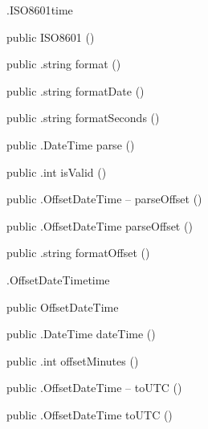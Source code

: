 \begin{CrexxClass}{.ISO8601}{time}

  \begin{Hierarchy}
  \end{Hierarchy}

  \begin{Members}

    \Factory
      {public}
      {ISO8601}
      {()}

    \Method
      {public}
      {.string}
      {format}
      {()}

    \Method
      {public}
      {.string}
      {formatDate}
      {()}

    \Method
      {public}
      {.string}
      {formatSeconds}
      {()}

    \Method
      {public}
      {.DateTime}
      {parse}
      {()}

    \Method
      {public}
      {.int}
      {isValid}
      {()}

    \Method
      {public}
      {.OffsetDateTime}
      {-- parseOffset}
      {()}

    \Method
      {public}
      {.OffsetDateTime}
      {parseOffset}
      {()}

    \Method
      {public}
      {.string}
      {formatOffset}
      {()}

  \end{Members}
\end{CrexxClass}

\begin{CrexxClass}{.OffsetDateTime}{time}

  \begin{Hierarchy}
  \end{Hierarchy}

  \begin{Members}

    \Factory
      {public}
      {OffsetDateTime}
      {}

    \Method
      {public}
      {.DateTime}
      {dateTime}
      {()}

    \Method
      {public}
      {.int}
      {offsetMinutes}
      {()}

    \Method
      {public}
      {.OffsetDateTime}
      {-- toUTC}
      {()}

    \Method
      {public}
      {.OffsetDateTime}
      {toUTC}
      {()}

  \end{Members}
\end{CrexxClass}

